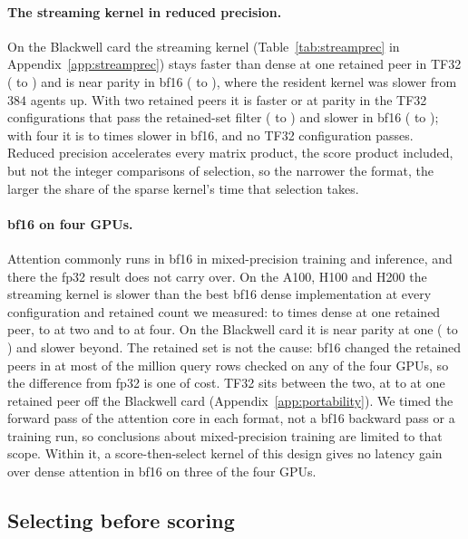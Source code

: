 \paragraph{The streaming kernel in reduced precision.} On the Blackwell card the
streaming kernel (Table~\ref{tab:streamprec} in Appendix~\ref{app:streamprec})
stays faster than dense at one retained peer in TF32 (\SPTfOneLo{} to
\SPTfOneHi{}) and is near parity in bf16 (\SPBfOneLo{} to \SPBfOneHi{}), where
the resident kernel was slower from $384$ agents up. With two retained peers it
is faster or at parity in the TF32 configurations that pass the retained-set
filter (\SPTfTwoLo{} to \SPTfTwoHi{}) and slower in bf16 (\SPBfTwoLo{} to
\SPBfTwoHi{}); with four it is \SPBfFourLo{} to \SPBfFourHi{} times slower in
bf16, and no TF32 configuration passes. Reduced precision accelerates every
matrix product, the score product included, but not the integer comparisons of
selection, so the narrower the format, the larger the share of the sparse
kernel's time that selection takes.

\paragraph{bf16 on four GPUs.} Attention commonly runs in bf16 in
mixed-precision training and inference, and there the fp32 result does not carry
over. On the A100, H100 and H200 the streaming kernel is slower than the best
bf16 dense implementation at every configuration and retained count we
measured: \PortBfOneLo{} to \PortBfOneHi{} times dense at one retained peer,
\PortBfTwoLo{} to \PortBfTwoHi{} at two and \PortBfFourLo{} to \PortBfFourHi{}
at four. On the Blackwell card it is near parity at one (\SPBfOneLo{} to
\SPBfOneHi{}) and slower beyond. The retained set is not the cause: bf16 changed
the retained peers in at most \PortBfMismatchMax{} of the \PortBfRowsM{} million
query rows checked on any of the four GPUs, so the difference from fp32 is one
of cost. TF32 sits between the two, at \PortTfOneLo{} to \PortTfOneHi{} at one
retained peer off the Blackwell card (Appendix~\ref{app:portability}). We timed
the forward pass of the attention core in each format, not a bf16 backward pass
or a training run, so conclusions about mixed-precision training are limited to
that scope. Within it, a score-then-select kernel of this design gives no
latency gain over dense attention in bf16 on three of the four GPUs.

\subsection{Selecting before scoring}
\label{sec:prescore}

